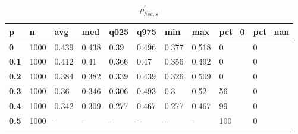 \begin{table}[h]
 \centering 
\footnotesize
\caption{$\rho_{hsc,s}^\prime $}
\label{tab:alphahscs}
\begin{tabular}[h]{|l|l|l|l|l|l|l|l|l|l|
    } \hline
\textbf{ p} & \textbf{ n} & \textbf{ avg} & \textbf{ med} & \textbf{ q025} & \textbf{ q975} & \textbf{ min} & \textbf{ max} & \textbf{ pct\_0} & \textbf{ pct\_nan}
    \\ \hline
  \textbf{  0} & 1000 & 0.439 & 0.438 &  0.39 & 0.496 & 0.377 & 0.518 &   0 & 0
    \\ \hline
  \textbf{0.1} & 1000 & 0.412 &  0.41 & 0.366 &  0.47 & 0.356 & 0.492 &   0 & 0
    \\ \hline
  \textbf{0.2} & 1000 & 0.384 & 0.382 & 0.339 & 0.439 & 0.326 & 0.509 &   0 & 0
    \\ \hline
  \textbf{0.3} & 1000 &  0.36 & 0.346 & 0.306 & 0.493 &   0.3 &  0.52 &  56 & 0
    \\ \hline
  \textbf{0.4} & 1000 & 0.342 & 0.309 & 0.277 & 0.467 & 0.277 & 0.467 &  99 & 0
    \\ \hline
  \textbf{0.5} & 1000 & - & - & - & - & - & - & 100 & 0
    \\ \hline
 \end{tabular}
 \end{table}
